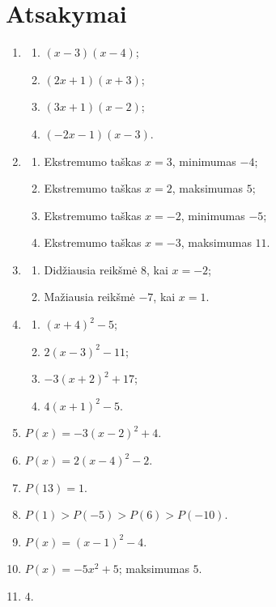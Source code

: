\documentclass[12pt,a4paper]{article}
\begin{document}
\section*{Atsakymai}
\begin{enumerate}
\item
\begin{enumerate}
  \item $(x-3)(x-4)$;
  \item $(2x+1)(x+3)$;
  \item $(3x+1)(x-2)$;
  \item $(-2x-1)(x-3)$.
\end{enumerate}

\item
\begin{enumerate}
  \item Ekstremumo taškas $x=3$, minimumas $-4$;
  \item Ekstremumo taškas $x=2$, maksimumas $5$;
  \item Ekstremumo taškas $x=-2$, minimumas $-5$;
  \item Ekstremumo taškas $x=-3$, maksimumas $11$.
\end{enumerate}

\item
\begin{enumerate}
  \item Didžiausia reikšmė $8$, kai $x=-2$;
  \item Mažiausia reikšmė $-7$, kai $x=1$.
\end{enumerate}

\item
\begin{enumerate}
  \item $(x+4)^2-5$;
  \item $2(x-3)^2-11$;
  \item $-3(x+2)^2+17$;
  \item $4(x+1)^2-5$.
\end{enumerate}

\item $P(x)=-3(x-2)^2+4$.

\item $P(x)=2(x-4)^2-2$.

\item $P(13)=1$.

\item $P(1)>P(-5)>P(6)>P(-10)$.

\item $P(x)=(x-1)^2-4$.

\item $P(x)=-5x^2+5$; maksimumas $5$.

\item $4$.
\end{enumerate}
\end{document}
